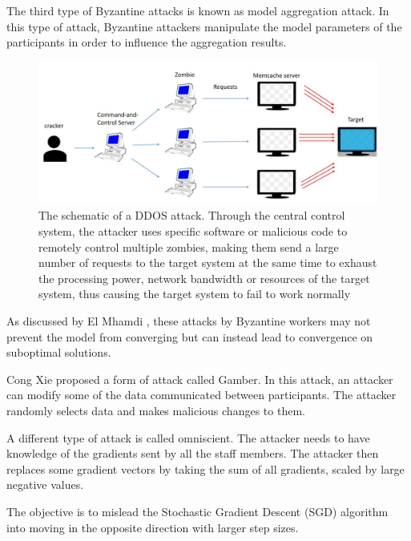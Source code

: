 \documentclass[conference]{IEEEtran}
\begin{document}
The third type of Byzantine attacks is known as model aggregation attack. In this type of attack, 
Byzantine attackers manipulate the model parameters of the participants in order to influence the 
aggregation results. 

\begin{figure}[htbp]
    \centerline{\includegraphics[width=0.8\linewidth,height=0.6\linewidth]{picture/ddos.jpg}}
    \caption{The schematic of a DDOS attack. Through the central control system, the attacker uses specific software or malicious code to remotely control multiple zombies, making them send a large number of requests to the target system at the same time to exhaust the processing power, network bandwidth or resources of the target system, thus causing the target system to fail to work normally}
    \label{fig13}
\end{figure}

As discussed by El Mhamdi \cite{b120}, these attacks by Byzantine workers may not 
prevent the model from converging but can instead lead to convergence on suboptimal solutions. 

Cong Xie \cite{b121} proposed a form of attack called Gamber. In this attack, an attacker can modify 
some of the data communicated between participants. The attacker randomly selects data and makes 
malicious changes to them. 

A different type of attack is called omniscient.
The attacker needs to have knowledge of the gradients sent by all the staff members.
The attacker then replaces some gradient vectors by taking the sum of all gradients, scaled by 
large negative values.

The objective is to mislead the Stochastic Gradient Descent (SGD) algorithm into moving in the opposite direction with larger step sizes.
\end{document}
